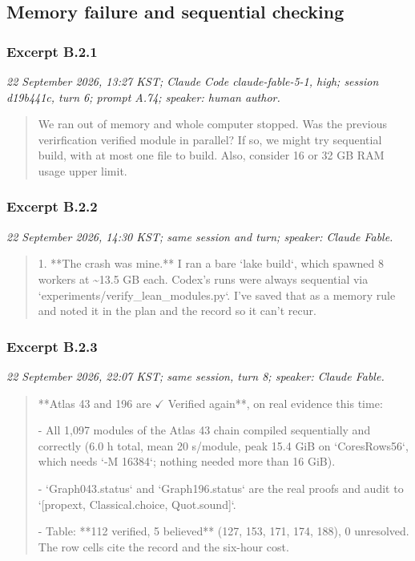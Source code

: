 \subsection{Memory failure and sequential checking}
\subsubsection*{Excerpt B.2.1}
\label{ex:B21}
\noindent\textit{22 September 2026, 13:27 KST; Claude Code claude-fable-5-1, high; session d19b441c, turn 6; prompt A.74; speaker: human author.}
\begin{quote}\small\ttfamily\raggedright
We ran out of memory and whole computer stopped. Was the previous verirfication verified module in parallel? If so, we might try sequential build, with at most one file to build. Also, consider 16 or 32 GB RAM usage upper limit.
\par
\end{quote}

\subsubsection*{Excerpt B.2.2}
\label{ex:B22}
\noindent\textit{22 September 2026, 14:30 KST; same session and turn; speaker: Claude Fable.}
\begin{quote}\small\ttfamily\raggedright
1. **The crash was mine.** I ran a bare `lake build`, which spawned 8 workers at \textasciitilde{}13.5 GB each. Codex's runs were always sequential via `experiments/verify\_lean\_modules.py`. I've saved that as a memory rule and noted it in the plan and the record so it can't recur.
\par
\end{quote}

\subsubsection*{Excerpt B.2.3}
\label{ex:B23}
\noindent\textit{22 September 2026, 22:07 KST; same session, turn 8; speaker: Claude Fable.}
\begin{quote}\small\ttfamily\raggedright
**Atlas 43 and 196 are \(\checkmark\) Verified again**, on real evidence this time:
\par
- All 1,097 modules of the Atlas 43 chain compiled sequentially and correctly (6.0 h total, mean 20 s/module, peak 15.4 GiB on `CoresRows56`, which needs `-M 16384`; nothing needed more than 16 GiB).
\par
- `Graph043.status` and `Graph196.status` are the real proofs and audit to `[propext, Classical.choice, Quot.sound]`.
\par
- Table: **112 verified, 5 believed** (127, 153, 171, 174, 188), 0 unresolved. The row cells cite the record and the six-hour cost.
\par
\end{quote}

